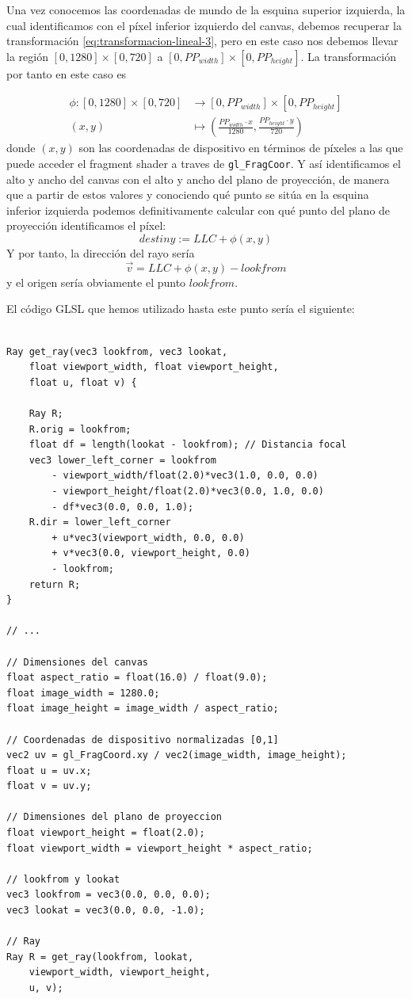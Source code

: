Una vez conocemos las coordenadas de mundo de la esquina superior izquierda, la cual identificamos con el píxel inferior izquierdo del canvas, debemos recuperar la transformación \ref{eq:transformacion-lineal-3}, pero en este caso nos debemos llevar la región $[0,1280]\times[0,720]$ a $[0,PP_{width}]\times[0,PP_{height}]$. La transformación por tanto en este caso es

\begin{equation}
    \label{eq:transformacion-lineal-4}
    \begin{split}
        \phi : [0,1280]\times [0,720] & \longrightarrow [0,PP_{width}]\times[0,PP_{height}] \\
        (x,y) & \longmapsto \left(\frac{PP_{width}\cdot x}{1280},\frac{PP_{height}\cdot y}{720}\right)
    \end{split}
\end{equation}
donde $(x,y)$ son las coordenadas de dispositivo en términos de píxeles a las que puede acceder el fragment shader a traves de \verb|gl_FragCoor|. Y así identificamos el alto y ancho del canvas con el alto y ancho del plano de proyección, de manera que a partir de estos valores y conociendo qué punto se sitúa en la esquina inferior izquierda podemos definitivamente calcular con qué punto del plano de proyección identificamos el píxel:
$$
destiny := LLC + \phi(x,y)
$$
Y por tanto, la dirección del rayo sería
$$
\vec v = LLC + \phi(x,y) - lookfrom
$$
y el origen sería obviamente el punto $lookfrom$.

El código GLSL que hemos utilizado hasta este punto sería el siguiente:

\begin{lstlisting}

Ray get_ray(vec3 lookfrom, vec3 lookat, 
    float viewport_width, float viewport_height, 
    float u, float v) {
    
    Ray R;
    R.orig = lookfrom;
    float df = length(lookat - lookfrom); // Distancia focal
    vec3 lower_left_corner = lookfrom
        - viewport_width/float(2.0)*vec3(1.0, 0.0, 0.0)
        - viewport_height/float(2.0)*vec3(0.0, 1.0, 0.0) 
        - df*vec3(0.0, 0.0, 1.0);
    R.dir = lower_left_corner 
        + u*vec3(viewport_width, 0.0, 0.0)
        + v*vec3(0.0, viewport_height, 0.0) 
        - lookfrom;
    return R;
}

// ... 

// Dimensiones del canvas
float aspect_ratio = float(16.0) / float(9.0);
float image_width = 1280.0;
float image_height = image_width / aspect_ratio;

// Coordenadas de dispositivo normalizadas [0,1]
vec2 uv = gl_FragCoord.xy / vec2(image_width, image_height); 
float u = uv.x;
float v = uv.y;

// Dimensiones del plano de proyeccion
float viewport_height = float(2.0);
float viewport_width = viewport_height * aspect_ratio;

// lookfrom y lookat
vec3 lookfrom = vec3(0.0, 0.0, 0.0);
vec3 lookat = vec3(0.0, 0.0, -1.0);

// Ray
Ray R = get_ray(lookfrom, lookat, 
    viewport_width, viewport_height, 
    u, v);
\end{lstlisting}

